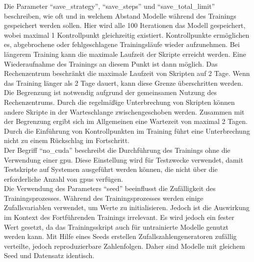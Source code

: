 Die Parameter \enquote{save\_strategy}, \enquote{save\_steps} und \enquote{save\_total\_limit} beschreiben, wie oft und in welchem Abstand Modelle während des Trainings gespeichert werden sollen.
Hier wird alle 100 Iterationen das Modell gespeichert, wobei maximal 1 Kontrollpunkt gleichzeitig existiert.
Kontrollpunkte ermöglichen es, abgebrochene oder fehlgeschlagene Trainingsläufe wieder aufzunehmen.
Bei längerem Training kann die maximale Laufzeit der Skripte erreicht werden.
Eine Wiederaufnahme des Trainings an diesem Punkt ist dann möglich.
Das Rechenzentrum beschränkt die maximale Laufzeit von Skripten auf 2 Tage.
Wenn das Training länger als 2 Tage dauert, kann diese Grenze überschritten werden.
Die Begrenzung ist notwendig aufgrund der gemeinsamen Nutzung des Rechenzentrums.
Durch die regelmäßige Unterbrechung von Skripten können andere Skripte in der Warteschlange zwischengeschoben werden.
Zusammen mit der Begrenzung ergibt sich im Allgemeinen eine Wartezeit von maximal 2 Tagen.
Durch die Einführung von Kontrollpunkten im Training führt eine Unterbrechung nicht zu einem Rückschlag im Fortschritt.\\

Der Begriff \enquote{no\_cuda} beschreibt die Durchführung des Trainings ohne die Verwendung einer \ac{gpu}.
Diese Einstellung wird für Testzwecke verwendet, damit Testskripte auf Systemen ausgeführt werden können, die nicht über die erforderliche Anzahl von \ac{gpu}s verfügen.\\

Die Verwendung des Parameters \enquote{seed} beeinflusst die Zufälligkeit des Trainingsprozesses.
Während des Trainingsprozesses werden einige Zufallsvariablen verwendet, um Werte zu initialisieren.
Jedoch ist die Auswirkung im Kontext des Fortführenden Trainings irrelevant.
Es wird jedoch ein fester Wert gesetzt, da das Trainingsskript auch für untrainierte Modelle genutzt werden kann.
Mit Hilfe eines Seeds erstellen Zufallszahlengeneratoren zufällig verteilte, jedoch reproduzierbare Zahlenfolgen.
Daher sind Modelle mit gleichem Seed und Datensatz identisch.\\

